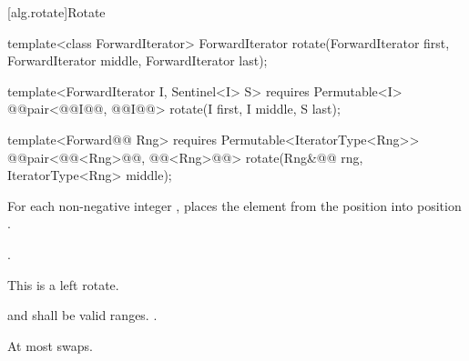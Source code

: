 [alg.rotate]{Rotate}

%
\begin{removedblock}
\begin{itemdecl}
template<class ForwardIterator>
  ForwardIterator rotate(ForwardIterator first, ForwardIterator middle,
              ForwardIterator last);
\end{itemdecl}
\end{removedblock}
\begin{addedblock}
\begin{itemdecl}
template<ForwardIterator I, Sentinel<I> S>
  requires Permutable<I>
  @@pair<@@I@\newtxt{)}@, @@I@\newtxt{)}@> rotate(I first, I middle, S last);

template<Forward@@ Rng>
  requires Permutable<IteratorType<Rng>>
  @@pair<@@<Rng>@\newtxt{)}@,
              @@<Rng>@\newtxt{)}@>
    rotate(Rng&@\newtxt{\&}@ rng, IteratorType<Rng> middle);
\end{itemdecl}
\end{addedblock}

\begin{itemdescr}
\pnum
\effects
For each non-negative integer
,
places the element from the position
into position
.

\pnum
\returns {}.

\pnum
\notes
This is a left rotate.

\pnum
\requires
{}
and
shall be valid ranges.
.

\pnum
\complexity
At most
swaps.
\end{itemdescr}

